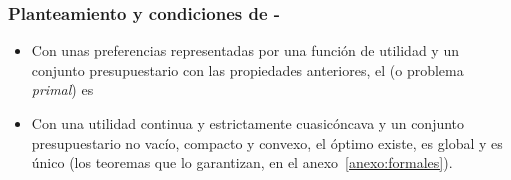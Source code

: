 \documentclass[11pt]{article}
\begin{document}
\subsubsection{Planteamiento y condiciones de -}\label{sec:planteamiento-condiciones-kuhn}

\begin{itemize}
\item Con unas preferencias representadas por una función de utilidad y un conjunto presupuestario con las propiedades anteriores, el  (o problema \emph{primal}) es
\item Con una utilidad continua y estrictamente cuasicóncava y un conjunto presupuestario no vacío, compacto y convexo, el óptimo existe, es global y es único (los teoremas que lo garantizan, en el anexo~\ref{anexo:formales}).
\end{itemize}
\end{document}
